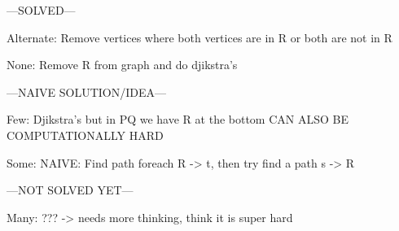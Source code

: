 ---SOLVED---

Alternate:
Remove vertices where both vertices are in R or both are not in R

None: 
Remove R from graph and do djikstra's 


---NAIVE SOLUTION/IDEA---

Few: 
Djikstra's but in PQ we have R at the bottom
CAN ALSO BE COMPUTATIONALLY HARD

Some: 
NAIVE: Find path foreach R -> t, then try find a path s -> R


---NOT SOLVED YET---

Many: 
??? -> needs more thinking, think it is super hard


